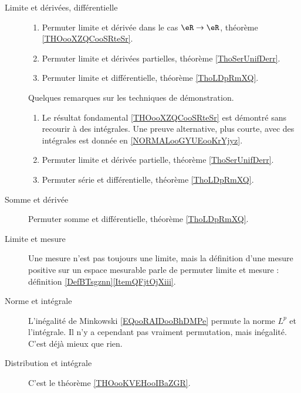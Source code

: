 \begin{description}
	\item[Limite et dérivées, différentielle]
		\begin{enumerate}
			\item
			      Permuter limite et dérivée dans le cas \( \eR\to \eR\), théorème \ref{THOooXZQCooSRteSr}.
			\item
			      Permuter limite et dérivées partielles, théorème \ref{ThoSerUnifDerr}.
			\item
			      Permuter limite et différentielle, théorème \ref{ThoLDpRmXQ}.
		\end{enumerate}
		Quelques remarques sur les techniques de démonstration.
		\begin{enumerate}
			\item
			      Le résultat fondamental \ref{THOooXZQCooSRteSr} est démontré sans recourir à des intégrales. Une preuve alternative, plus courte, avec des intégrales est donnée en \ref{NORMALooGYUEooKrYjyz}.
			\item
			      Permuter limite et dérivée partielle, théorème \ref{ThoSerUnifDerr}.
			\item
			      Permuter série et différentielle, théorème \ref{ThoLDpRmXQ}.
		\end{enumerate}
	\item[Somme et dérivée]
		Permuter somme et différentielle, théorème \ref{ThoLDpRmXQ}.
	\item[Limite et mesure]
		Une mesure n'est pas toujours une limite, mais la définition d'une mesure positive sur un espace mesurable parle de permuter limite et mesure : définition \ref{DefBTsgznn}\ref{ItemQFjtOjXiii}.
	\item[Norme et intégrale]
		L'inégalité de Minkowski \eqref{EQooRAIDooBhDMPe} permute la norme \( L^p\) et l'intégrale. Il n'y a cependant pas vraiment permutation, mais inégalité. C'est déjà mieux que rien.
	\item[Distribution et intégrale] C'est le théorème \ref{THOooKVEHooIBaZGR}.
\end{description}
